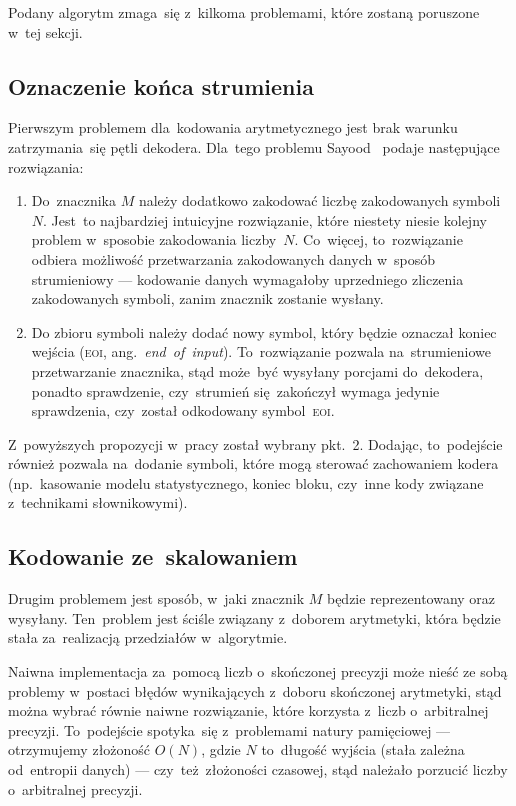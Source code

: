 \documentclass[../../thesis.tex]{subfiles}
\begin{document}
Podany algorytm zmaga~się z~kilkoma problemami, które zostaną poruszone w~tej sekcji.

\subsection{Oznaczenie końca strumienia}

Pierwszym problemem dla~kodowania arytmetycznego jest brak warunku
zatrzymania~się pętli dekodera. Dla~tego problemu Sayood~\cite{Sayood:IDC}
podaje następujące rozwiązania:

\begin{enumerate}
  \item Do~znacznika \( M \) należy dodatkowo zakodować liczbę zakodowanych
    symboli \( N \). Jest~to najbardziej intuicyjne rozwiązanie, które niestety niesie
    kolejny problem w~sposobie zakodowania liczby~\( N \). Co~więcej, to~rozwiązanie
    odbiera możliwość przetwarzania zakodowanych danych w~sposób strumieniowy ---
    kodowanie danych wymagałoby uprzedniego zliczenia zakodowanych symboli,
    zanim znacznik zostanie wysłany.
  \item Do zbioru symboli należy dodać nowy symbol, który będzie oznaczał koniec 
    wejścia (\textsc{eoi}, ang.~\emph{end~of~input}). To~rozwiązanie pozwala na~strumieniowe
    przetwarzanie znacznika, stąd może~być wysyłany porcjami do~dekodera, ponadto
    sprawdzenie, czy~strumień się~zakończył wymaga jedynie sprawdzenia, czy~został
    odkodowany symbol~\textsc{eoi}.
\end{enumerate}

Z~powyższych propozycji w~pracy został wybrany pkt.~2. Dodając, to~podejście również
pozwala na~dodanie symboli, które mogą sterować zachowaniem kodera (np.~kasowanie
modelu statystycznego, koniec bloku, czy~inne kody związane z~technikami słownikowymi).

\subsection{Kodowanie ze~skalowaniem}

Drugim problemem jest sposób, w~jaki znacznik \( M \) będzie reprezentowany
oraz wysyłany. Ten~problem jest ściśle związany z~doborem arytmetyki, która będzie
stała za~realizacją przedziałów w~algorytmie.

Naiwna implementacja za~pomocą liczb o~skończonej precyzji może nieść ze sobą
problemy w~postaci błędów wynikających z~doboru skończonej arytmetyki, stąd
można wybrać równie naiwne rozwiązanie, które korzysta z~liczb o~arbitralnej precyzji.
To~podejście spotyka~się z~problemami natury pamięciowej --- otrzymujemy złożoność
\( O (N) \), gdzie \( N \) to~długość wyjścia (stała zależna od~entropii danych) ---
czy~też~złożoności czasowej, stąd należało porzucić liczby o~arbitralnej precyzji.
\end{document}
